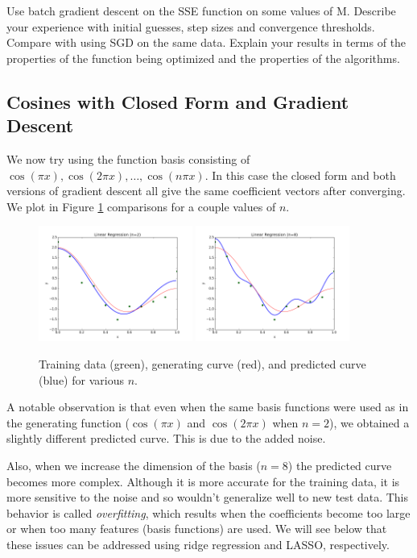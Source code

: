 \documentclass[10pt]{paper}
\begin{document}
Use batch gradient descent on the SSE function on some values of M. Describe your experience
with initial guesses, step sizes and convergence thresholds. Compare with using SGD on the
same data. Explain your results in terms of the properties of the function being optimized and
the properties of the algorithms.

\subsection{Cosines with Closed Form and Gradient Descent}

We now try using the function basis consisting of $\cos(\pi x), \cos(2 \pi x), \dots, \cos(n \pi x)$. In this case the closed form and both versions of gradient descent all give the same coefficient vectors after converging. We plot in Figure \ref{fig:cos} comparisons for a couple values of $n$.

\begin{figure}[ht!]
  \centering
  \label{fig:cos}
  \includegraphics[width=0.45\textwidth]{../images/cos2.png}
  \includegraphics[width=0.45\textwidth]{../images/cos8.png}
  \caption{Training data (green), generating curve (red), and predicted curve (blue) for various $n$.}
\end{figure}

A notable observation is that even when the same basis functions were used as in the generating function ($\cos(\pi x)$ and $\cos(2\pi x)$ when $n=2$), we obtained a slightly different predicted curve. This is due to the added noise.

Also, when we increase the dimension of the basis ($n=8$) the predicted curve becomes more complex. Although it is more accurate for the training data, it is more sensitive to the noise and so wouldn't generalize well to new test data. This behavior is called \emph{overfitting}, which results when the coefficients become too large or when too many features (basis functions) are used. We will see below that these issues can be addressed using ridge regression and LASSO, respectively.
\end{document}
